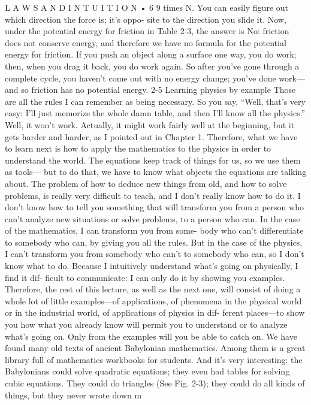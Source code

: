 \documentclass[10pt,oneside]{article}
\begin{document}
L A W S  A N D  I N T U I T I O N • 6 9 times N. You can easily figure out which direction the force is; it’s oppo- site to the direction you slide it. Now, under the potential energy for friction in Table 2-3, the answer is No: friction does not conserve energy, and therefore we have no formula for the potential energy for friction. If you push an object along a surface one way, you do work; then, when you drag it back, you do work again. So after you’ve gone through a complete cycle, you haven’t come out with no energy change; you’ve done work---and so friction has no potential energy. 2-5 Learning physics by example Those are all the rules I can remember as being necessary. So you say, “Well, that’s very easy: I’ll just memorize the whole damn table, and then I’ll know all the physics.” Well, it won’t work. Actually, it might work fairly well at the beginning, but it gets harder and harder, as I pointed out in Chapter 1. Therefore, what we have to learn next is how to apply the mathematics to the physics in order to understand the world. The equations keep track of things for us, so we use them as tools--- but to do that, we have to know what objects the equations are talking about. The problem of how to deduce new things from old, and how to solve problems, is really very difficult to teach, and I don’t really know how to do it. I don’t know how to tell you something that will transform you from a person who can’t analyze new situations or solve problems, to a person who can. In the case of the mathematics, I can transform you from some- body who can’t differentiate to somebody who can, by giving you all the rules. But in the case of the physics, I can’t transform you from somebody who can’t to somebody who can, so I don’t know what to do. Because I intuitively understand what’s going on physically, I find it dif- ficult to communicate: I can only do it by showing you examples. Therefore, the rest of this lecture, as well as the next one, will consist of doing a whole lot of little examples---of applications, of phenomena in the physical world or in the industrial world, of applications of physics in dif- ferent places---to show you how what you already know will permit you to understand or to analyze what’s going on. Only from the examples will you be able to catch on. We have found many old texts of ancient Babylonian mathematics. Among them is a great library full of mathematics workbooks for students. And it’s very interesting: the Babylonians could solve quadratic equations; they even had tables for solving cubic equations. They could do triangles (See Fig. 2-3); they could do all kinds of things, but they never wrote down m\par
\end{document}
